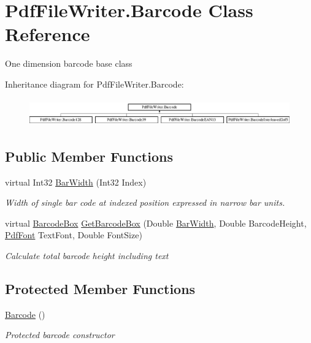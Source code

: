 \hypertarget{class_pdf_file_writer_1_1_barcode}{}\section{Pdf\+File\+Writer.\+Barcode Class Reference}
\label{class_pdf_file_writer_1_1_barcode}


One dimension barcode base class  


Inheritance diagram for Pdf\+File\+Writer.\+Barcode\+:\begin{figure}[H]
\begin{center}
\leavevmode
\includegraphics[height=1.196581cm]{class_pdf_file_writer_1_1_barcode}
\end{center}
\end{figure}
\subsection*{Public Member Functions}
\begin{DoxyCompactItemize}
\item 
virtual Int32 \hyperlink{class_pdf_file_writer_1_1_barcode_adf11f62c74801b9d146c4eb430f7ba25}{Bar\+Width} (Int32 Index)
\begin{DoxyCompactList}\small\item\em Width of single bar code at indexed position expressed in narrow bar units. \end{DoxyCompactList}\item 
virtual \hyperlink{class_pdf_file_writer_1_1_barcode_box}{Barcode\+Box} \hyperlink{class_pdf_file_writer_1_1_barcode_ae0798dea7667ca7e9c29bd894574bd44}{Get\+Barcode\+Box} (Double \hyperlink{class_pdf_file_writer_1_1_barcode_adf11f62c74801b9d146c4eb430f7ba25}{Bar\+Width}, Double Barcode\+Height, \hyperlink{class_pdf_file_writer_1_1_pdf_font}{Pdf\+Font} Text\+Font, Double Font\+Size)
\begin{DoxyCompactList}\small\item\em Calculate total barcode height including text \end{DoxyCompactList}\end{DoxyCompactItemize}
\subsection*{Protected Member Functions}
\begin{DoxyCompactItemize}
\item 
\hyperlink{class_pdf_file_writer_1_1_barcode_a364bb4883e4eafd7ecabb57edca8541e}{Barcode} ()
\begin{DoxyCompactList}\small\item\em Protected barcode constructor \end{DoxyCompactList}\end{DoxyCompactItemize}
